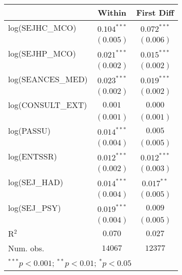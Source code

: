
\usepackage{booktabs}

\begin{tabular}{l c c}
\toprule
 & Within & First Diff \\
\midrule
log(SEJHC\_MCO)   & $0.104^{***}$ & $0.072^{***}$ \\
                  & $(0.005)$     & $(0.006)$     \\
log(SEJHP\_MCO)   & $0.021^{***}$ & $0.015^{***}$ \\
                  & $(0.002)$     & $(0.002)$     \\
log(SEANCES\_MED) & $0.023^{***}$ & $0.019^{***}$ \\
                  & $(0.002)$     & $(0.002)$     \\
log(CONSULT\_EXT) & $0.001$       & $0.000$       \\
                  & $(0.001)$     & $(0.001)$     \\
log(PASSU)        & $0.014^{***}$ & $0.005$       \\
                  & $(0.004)$     & $(0.005)$     \\
log(ENTSSR)       & $0.012^{***}$ & $0.012^{***}$ \\
                  & $(0.002)$     & $(0.003)$     \\
log(SEJ\_HAD)     & $0.014^{***}$ & $0.017^{**}$  \\
                  & $(0.004)$     & $(0.005)$     \\
log(SEJ\_PSY)     & $0.019^{***}$ & $0.009$       \\
                  & $(0.004)$     & $(0.005)$     \\
\midrule
R$^2$             & $0.070$       & $0.027$       \\
Num. obs.         & $14067$       & $12377$       \\
\bottomrule
\multicolumn{3}{l}{\scriptsize{$^{***}p<0.001$; $^{**}p<0.01$; $^{*}p<0.05$}}
\end{tabular}
